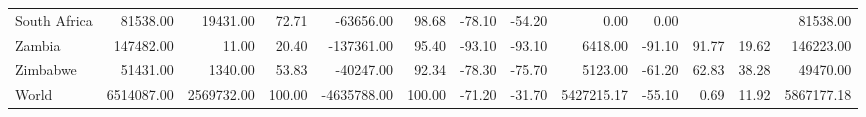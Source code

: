 \begin{table}[ht]
\begin{tabular}{lrrrrrrrrrrrr}
  South Africa & 81538.00 & 19431.00 & 72.71 & -63656.00 & 98.68 & -78.10 & -54.20 & 0.00 & 0.00 &  &  & 81538.00 \\ 
  Zambia & 147482.00 & 11.00 & 20.40 & -137361.00 & 95.40 & -93.10 & -93.10 & 6418.00 & -91.10 & 91.77 & 19.62 & 146223.00 \\ 
  Zimbabwe & 51431.00 & 1340.00 & 53.83 & -40247.00 & 92.34 & -78.30 & -75.70 & 5123.00 & -61.20 & 62.83 & 38.28 & 49470.00 \\ 
  World & 6514087.00 & 2569732.00 & 100.00 & -4635788.00 & 100.00 & -71.20 & -31.70 & 5427215.17 & -55.10 & 0.69 & 11.92 & 5867177.18 \\ 
   \hline
\end{tabular}
\end{table}
